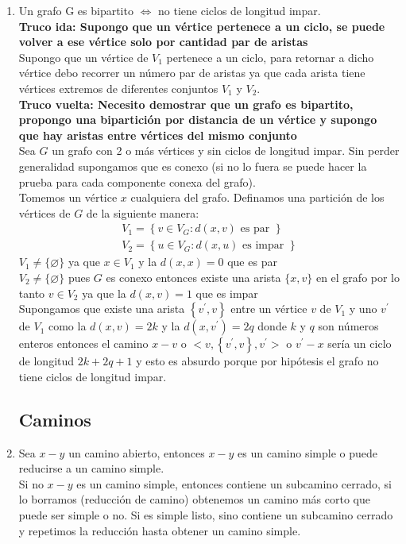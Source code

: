 \documentclass{article}
\begin{document}
\begin{enumerate}
    \item Un grafo G es bipartito $\iff$ no tiene ciclos de longitud impar. \\
    \textbf{Truco ida: Supongo que un vértice pertenece a un ciclo, se puede volver a ese vértice solo por cantidad par de aristas} \\
    Supongo que un vértice de $V_1$ pertenece a un ciclo, para retornar a dicho vértice debo recorrer un número par de aristas ya que cada arista tiene vértices extremos de diferentes conjuntos $V_1$ y $V_2$. \\
    \textbf{Truco vuelta: Necesito demostrar que un grafo es bipartito, propongo una bipartición por distancia de un vértice y supongo que hay aristas entre vértices del mismo conjunto} \\
    Sea $G$ un grafo con 2 o más vértices y sin ciclos de longitud impar. Sin perder generalidad supongamos que es conexo (si no lo fuera se puede hacer la prueba para cada componente conexa del grafo). \\
    Tomemos un vértice $x$ cualquiera del grafo. Definamos una partición de los vértices de $G$ de la siguiente manera:
    $$
    \begin{array}{c}
    V_{1}=\left\{v \in V_{G}: d(x, v) \text { es par }\right\} \\
    V_{2}=\left\{u \in V_{G}: d(x, u) \text { es impar }\right\}
    \end{array}
    $$
    $V_{1} \neq\{\varnothing\}$ ya que $x \in V_{1}$ y la $d(x, x)=0$ que es par \\
    $V_{2} \neq\{\varnothing\}$ pues $G$ es conexo entonces existe una arista $\{x, v\}$ en el grafo por lo tanto $v \in V_{2}$ ya que la $d(x, v)=1$ que es impar \\
    Supongamos que existe una arista $\left\{v^{\prime}, v\right\}$ entre un vértice $v$ de $V_{1}$ y uno $v^{\prime}$ de $V_{1}$ como la $d(x, v)=2 k$ y la $d\left(x, v^{\prime}\right)=2 q$ donde $k$ y $q$ son números enteros entonces el camino $x-v$ o $<v,\left\{v^{\prime}, v\right\}, v^{\prime}>$ o $v^{\prime}-x$ sería un ciclo de longitud $2 k+2 q+1$ y esto es absurdo porque por hipótesis el grafo no tiene ciclos de longitud impar.

\subsection{Caminos}

    \item Sea $x - y$ un camino abierto, entonces $x − y$ es un camino simple o puede reducirse a un camino simple. \\
    Si no $x - y$ es un camino simple, entonces contiene un subcamino cerrado, si lo
    borramos (reducción de camino) obtenemos un camino más corto que puede ser
    simple o no. Si es simple listo, sino contiene un subcamino cerrado y repetimos la reducción hasta obtener un camino simple.
    

\end{enumerate}
\end{document}
